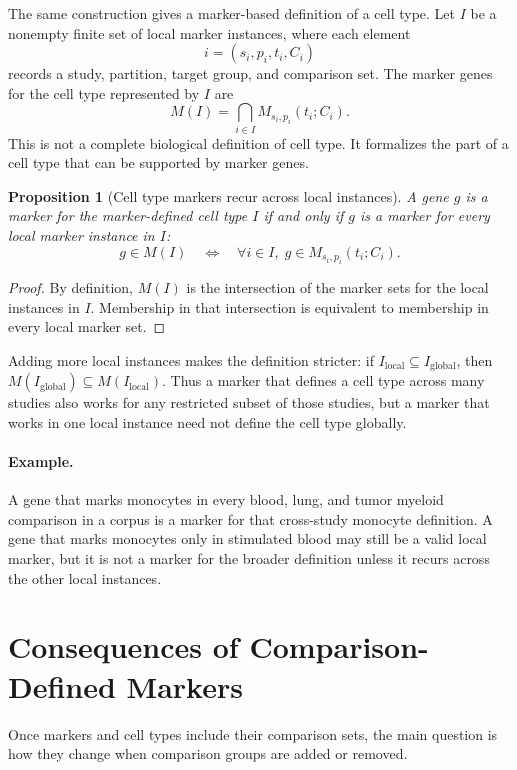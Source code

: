 \documentclass{article}
\newtheorem{proposition}{Proposition}
\begin{document}
The same construction gives a marker-based definition of a cell type. Let $I$ be a nonempty finite set of local marker instances, where each element
\[
  i=(s_i,p_i,t_i,C_i)
\]
records a study, partition, target group, and comparison set. The marker genes for the cell type represented by $I$ are
\[
  M(I)=\bigcap_{i\in I} M_{s_i,p_i}(t_i;C_i).
\]
This is not a complete biological definition of cell type. It formalizes the part of a cell type that can be supported by marker genes.

\begin{proposition}[Cell type markers recur across local instances]\label{prop:cell-type-marker-recurrence}
A gene $g$ is a marker for the marker-defined cell type $I$ if and only if $g$ is a marker for every local marker instance in $I$:
\[
  g\in M(I)
  \quad\Longleftrightarrow\quad
  \forall i\in I,\; g\in M_{s_i,p_i}(t_i;C_i).
\]
\end{proposition}

\begin{proof}
By definition, $M(I)$ is the intersection of the marker sets for the local instances in $I$. Membership in that intersection is equivalent to membership in every local marker set.
\end{proof}

Adding more local instances makes the definition stricter: if $I_{\mathrm{local}}\subseteq I_{\mathrm{global}}$, then $M(I_{\mathrm{global}})\subseteq M(I_{\mathrm{local}})$. Thus a marker that defines a cell type across many studies also works for any restricted subset of those studies, but a marker that works in one local instance need not define the cell type globally.

\paragraph{Example.}
A gene that marks monocytes in every blood, lung, and tumor myeloid comparison in a corpus is a marker for that cross-study monocyte definition. A gene that marks monocytes only in stimulated blood may still be a valid local marker, but it is not a marker for the broader definition unless it recurs across the other local instances.

\section{Consequences of Comparison-Defined Markers}

Once markers and cell types include their comparison sets, the main question is how they change when comparison groups are added or removed.
\end{document}
